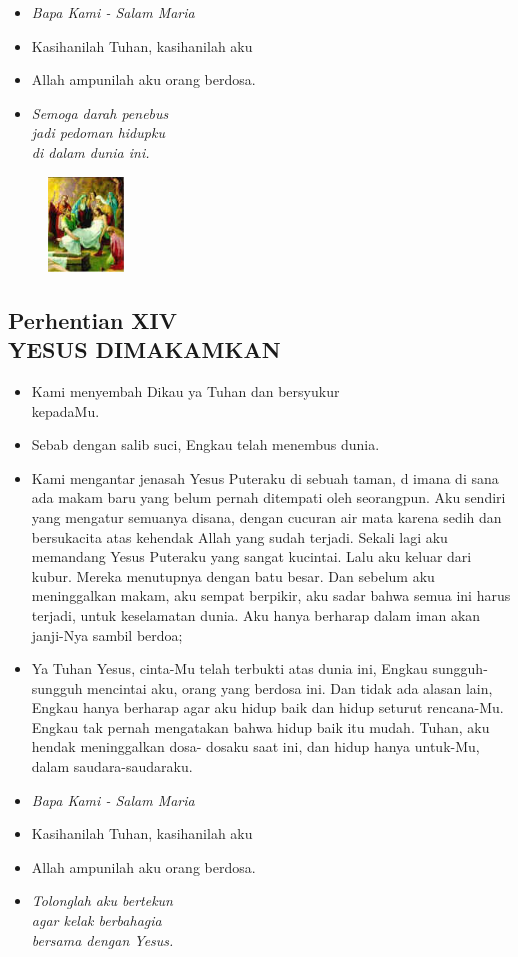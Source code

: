 \documentclass[a5paper,headsepline,titlepage,10pt,nnormalheadings,DIVcalc]{scrbook}
\newcommand{\BU}[1]{\begin{itemize} \item[U:] #1 \end{itemize}}
\newcommand{\BP}[1]{\begin{itemize} \item[P:] #1 \end{itemize}}
\begin{document}
\large\begin{itemize}\item[~]\it{Bapa Kami - Salam Maria}\end{itemize}\normalsize
\BP{Kasihanilah Tuhan, kasihanilah aku}
   \BU{Allah ampunilah aku orang berdosa.}

\begin{itemize}
\item[13.] \it{Semoga darah penebus\\jadi pedoman hidupku\\
      di dalam dunia ini.
}\end{itemize}

\begin{figure}
\includegraphics[width=2cm]{jalansalib_files/14_small.jpg}
\end{figure}
\subsection*{Perhentian XIV\\
YESUS DIMAKAMKAN}

\BP{   Kami menyembah Dikau ya Tuhan dan bersyukur\\kepadaMu.}
\BU{   Sebab dengan salib suci, Engkau telah menembus dunia.}

\BP{Kami mengantar jenasah  Yesus  Puteraku  di sebuah  taman, d imana di sana ada makam baru yang belum pernah ditempati oleh seorangpun. Aku sendiri yang mengatur semuanya disana, dengan cucuran air mata karena sedih dan bersukacita      atas kehendak Allah yang sudah terjadi. Sekali lagi aku memandang Yesus Puteraku yang sangat kucintai. Lalu aku keluar dari kubur. Mereka menutupnya dengan batu besar. Dan sebelum aku meninggalkan makam, aku sempat berpikir, aku sadar bahwa semua ini harus terjadi, untuk keselamatan dunia. Aku hanya berharap dalam iman akan janji-Nya sambil berdoa;}

\BU{Ya Tuhan Yesus, cinta-Mu telah terbukti atas dunia ini, Engkau sungguh-sungguh mencintai aku, orang yang berdosa ini. Dan tidak ada alasan lain, Engkau hanya berharap agar aku hidup baik dan hidup seturut rencana-Mu. Engkau tak pernah mengatakan bahwa hidup baik itu mudah. Tuhan, aku hendak meninggalkan dosa-     dosaku saat ini, dan hidup hanya untuk-Mu, dalam saudara-saudaraku.}

\large\begin{itemize}\item[~]\it{Bapa Kami - Salam Maria}\end{itemize}\normalsize
\BP{Kasihanilah Tuhan, kasihanilah aku}
   \BU{Allah ampunilah aku orang berdosa.}

\begin{itemize}
\item[14.] \it{Tolonglah aku bertekun\\agar kelak berbahagia\\
      bersama dengan Yesus.
}\end{itemize}
\end{document}
